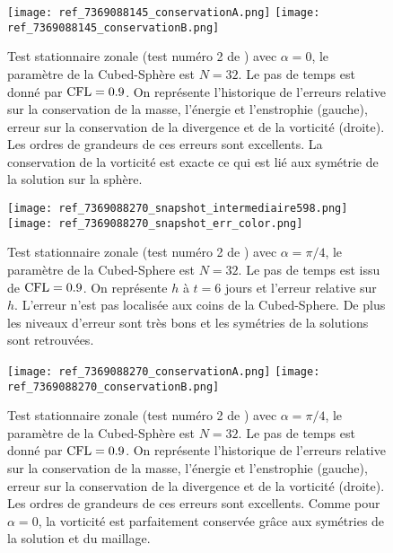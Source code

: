 \begin{figure}[htbp]
\begin{center}
\texttt{[image: ref\_7369088145\_conservationA.png]}
\texttt{[image: ref\_7369088145\_conservationB.png]}
\end{center}
\caption{Test stationnaire zonale (test numéro 2 de \cite{Williamson1992}) avec $\alpha=0$, le paramètre de la Cubed-Sphère est $N=32$. Le pas de temps est donné par $\text{CFL}=0.9$. On représente l'historique de l'erreurs relative sur la conservation de la masse, l'énergie et l'enstrophie (gauche), erreur sur la conservation de la divergence et de la vorticité (droite). Les ordres de grandeurs de ces erreurs sont excellents. La conservation de la vorticité est exacte ce qui est lié aux symétrie de la solution sur la sphère.}
\label{fig: williamson 2 conservation alpha=0}
\end{figure}

\begin{figure}[htbp]
\begin{center}
\texttt{[image: ref\_7369088270\_snapshot\_intermediaire598.png]}\\
\texttt{[image: ref\_7369088270\_snapshot\_err\_color.png]}
\end{center}
\caption{Test stationnaire zonale (test numéro 2 de \cite{Williamson1992}) avec $\alpha=\pi/4$, le paramètre de la Cubed-Sphere est $N=32$. Le pas de temps est issu de $\text{CFL}=0.9$. On représente $h$ à $t=6$ jours et l'erreur relative sur $h$. L'erreur n'est pas localisée aux coins de la Cubed-Sphere. De plus les niveaux d'erreur sont très bons et les symétries de la solutions sont retrouvées.}
\label{fig: williamson 2 space alpha=pi/4}
\end{figure}

\begin{figure}[htbp]
\begin{center}
\texttt{[image: ref\_7369088270\_conservationA.png]}
\texttt{[image: ref\_7369088270\_conservationB.png]}
\end{center}
\caption{Test stationnaire zonale (test numéro 2 de \cite{Williamson1992}) avec $\alpha=\pi/4$, le paramètre de la Cubed-Sphère est $N=32$. Le pas de temps est donné par $\text{CFL}=0.9$. On représente l'historique de l'erreurs relative sur la conservation de la masse, l'énergie et l'enstrophie (gauche), erreur sur la conservation de la divergence et de la vorticité (droite). Les ordres de grandeurs de ces erreurs sont excellents. Comme pour $\alpha = 0$, la vorticité est parfaitement conservée grâce aux symétries de la solution et du maillage.}
\label{fig: williamson 2 conservation alpha=pi/4}
\end{figure}

